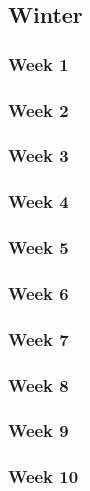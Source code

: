 \documentclass[../final.tex]{subfiles}
\begin{document}
\subsection{Winter}
\subsubsection{Week 1}
\subsubsection{Week 2}
\subsubsection{Week 3}
\subsubsection{Week 4}
\subsubsection{Week 5}
\subsubsection{Week 6}
\subsubsection{Week 7}
\subsubsection{Week 8}
\subsubsection{Week 9}
\subsubsection{Week 10}
\end{document}
